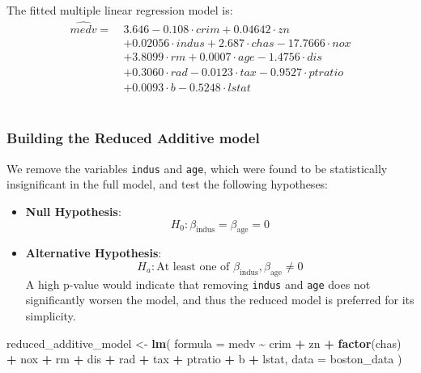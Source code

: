 \documentclass[
]{article}
\newenvironment{Shaded}{\begin{snugshade}}{\end{snugshade}}
\newcommand{\AttributeTok}[1]{\textcolor[rgb]{0.13,0.29,0.53}{#1}}
\newcommand{\FunctionTok}[1]{\textcolor[rgb]{0.13,0.29,0.53}{\textbf{#1}}}
\newcommand{\NormalTok}[1]{#1}
\newcommand{\OtherTok}[1]{\textcolor[rgb]{0.56,0.35,0.01}{#1}}
\newcommand{\SpecialCharTok}[1]{\textcolor[rgb]{0.81,0.36,0.00}{\textbf{#1}}}
\begin{document}
The fitted multiple linear regression model is: \[
\begin{aligned}
\hat{medv} =\ & 3.646 - 0.108 \cdot crim + 0.04642 \cdot zn \\
& + 0.02056 \cdot indus + 2.687 \cdot chas - 17.7666 \cdot nox \\
& + 3.8099 \cdot rm + 0.0007 \cdot age - 1.4756 \cdot dis \\
& + 0.3060 \cdot rad - 0.0123 \cdot tax - 0.9527 \cdot ptratio \\
& + 0.0093 \cdot b- 0.5248 \cdot lstat
\end{aligned}
\]\\

\subsubsection{Building the Reduced Additive
model}\label{building-the-reduced-additive-model}

We remove the variables \texttt{indus} and \texttt{age}, which were
found to be statistically insignificant in the full model, and test the
following hypotheses:

\begin{itemize}
\item
  \textbf{Null Hypothesis}:\\
  \[ H_0: \beta_{\text{indus}} = \beta_{\text{age}} = 0 \]
\item
  \textbf{Alternative Hypothesis}:\\
  \[ H_a: \text{At least one of } \beta_{\text{indus}}, \beta_{\text{age}} \ne 0 \]
  A high p-value would indicate that removing \texttt{indus} and
  \texttt{age} does not significantly worsen the model, and thus the
  reduced model is preferred for its simplicity.
\end{itemize}

\begin{Shaded}
\begin{Highlighting}[]
\NormalTok{reduced\_additive\_model }\OtherTok{\textless{}{-}} \FunctionTok{lm}\NormalTok{(}
  \AttributeTok{formula =}\NormalTok{ medv }\SpecialCharTok{\textasciitilde{}}\NormalTok{ crim }\SpecialCharTok{+}\NormalTok{ zn }\SpecialCharTok{+} \FunctionTok{factor}\NormalTok{(chas) }\SpecialCharTok{+}\NormalTok{ nox }\SpecialCharTok{+}\NormalTok{ rm }\SpecialCharTok{+}
\NormalTok{    dis }\SpecialCharTok{+}\NormalTok{ rad }\SpecialCharTok{+}\NormalTok{ tax }\SpecialCharTok{+}\NormalTok{ ptratio }\SpecialCharTok{+}\NormalTok{ b }\SpecialCharTok{+}\NormalTok{ lstat,}
  \AttributeTok{data =}\NormalTok{ boston\_data}
\NormalTok{)}
\end{Highlighting}
\end{Shaded}
\end{document}
